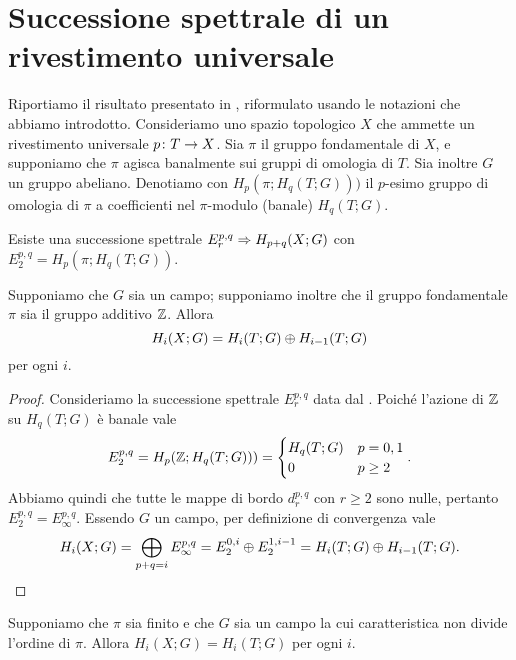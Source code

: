 \section{Successione spettrale di un rivestimento universale}
Riportiamo il risultato presentato in , riformulato usando le notazioni che abbiamo introdotto. Consideriamo uno spazio topologico \(X\) che ammette un rivestimento universale \(\map{p}{T}{X}\). Sia \(\pi\) il gruppo fondamentale di \(X\), e supponiamo che \(\pi\) agisca banalmente sui gruppi di omologia di \(T\). Sia inoltre \(G\) un gruppo abeliano. Denotiamo con \(H_p(\pi;H_q(T;G)))\) il \(p\)-esimo gruppo di omologia di \(\pi\) a coefficienti nel \(\pi\)-modulo (banale) \(H_q(T;G)\).
\begin{theorem}
Esiste una successione spettrale \(E^{p,q}_r\Rightarrow H_{p+q}(X;G)\) con \(E^{p,q}_2=H_p(\pi;H_q(T;G))\).
\end{theorem}
\begin{corollary}
Supponiamo che \(G\) sia un campo; supponiamo inoltre che il gruppo fondamentale \(\pi\) sia il gruppo additivo \(\mathbb{Z}\). Allora
\[
H_i(X;G)=H_i(T;G)\mathbin{\oplus} H_{i-1}(T;G)
\]
per ogni \(i\).
\end{corollary}
\begin{proof}
Consideriamo la successione spettrale \(E^{p,q}_r\) data dal . Poiché l'azione di \(\mathbb{Z}\) su \(H_q(T;G)\) è banale vale
\[
E^{p,q}_2=H_p(\mathbb{Z};H_q(T;G)))=
\begin{cases}
H_q(T;G)&p=0,1\\
0&p\ge 2
\end{cases}.
\]
Abbiamo quindi che tutte le mappe di bordo \(d^{p,q}_r\) con \(r\ge 2\) sono nulle, pertanto \(E^{p,q}_2=E^{p,q}_\infty\). Essendo \(G\) un campo, per definizione di convergenza vale
\[
H_i(X;G)=\bigoplus_{p+q=i}E^{p,q}_\infty=E^{0,i}_2\mathbin{\oplus} E^{1,i-1}_2=H_i(T;G)\mathbin{\oplus} H_{i-1}(T;G).\qedhere
\]
\end{proof}
\begin{corollary}
Supponiamo che \(\pi\) sia finito e che \(G\) sia un campo la cui caratteristica non divide l'ordine di \(\pi\). Allora \(H_i(X;G)=H_i(T;G)\) per ogni \(i\).
\end{corollary}
